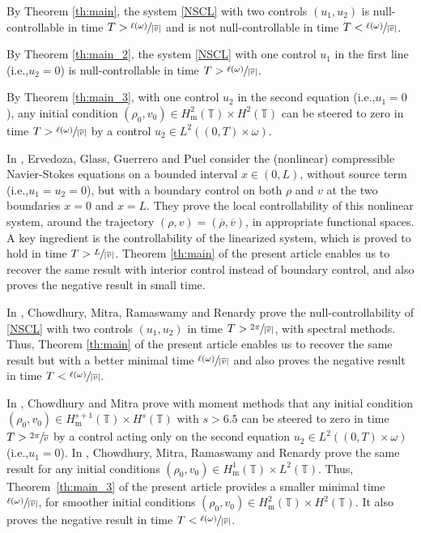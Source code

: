 \documentclass[11pt]{article}
\newcommand{\ie}{i.e.,\xspace}
\theoremstyle{plain}
\theoremstyle{definition}
\theoremstyle{remark}
\newcommand{\set}{\mathbb}
\newcommand{\T}{\set{T}}
\newcommand{\m}{{\mathrm m}}
\begin{document}
By Theorem \ref{th:main}, the system \eqref{NSCL} with two controls $(u_1,u_2)$ is null-controllable in time $T>\sfrac{\ell(\omega)}{|\overline{v}|}$ and is not null-controllable in time $T<\sfrac{\ell(\omega)}{|\overline{v}|}$.

By Theorem \ref{th:main_2}, the system \eqref{NSCL} with one control $u_1$ in the first line (\ie $u_2=0$) is null-controllable in time $T>\sfrac{\ell(\omega)}{|\overline{v}|}$.

By Theorem \ref{th:main_3}, with one control $u_2$ in the second equation (\ie $u_1=0$), any initial condition $(\rho_0,v_0)\in H^2_\m(\T)\times H^2(\T)$ can be steered to zero in time $T>\sfrac{\ell(\omega)}{|\overline{v}|}$ by a control $u_2 \in L^2((0,T)\times\omega)$.

In \cite{ervedoza_2012}, Ervedoza, Glass, Guerrero and Puel consider the (nonlinear) compressible Navier-Stokes equations on a bounded interval $x \in (0,L)$, without source term (\ie $u_1=u_2=0$), but with a boundary control on both $\rho$ and $v$ at the two boundaries $x=0$ and $x=L$. They prove the local controllability of this nonlinear system, around the trajectory $(\rho,v)=(\overline{\rho},\overline{v})$, in appropriate functional spaces. A key ingredient is the controllability of the linearized system, which is proved to hold in time $T>\sfrac{L}{|\overline{v}|}$. Theorem \ref{th:main} of the present article enables us to recover the same result with interior control instead of boundary control, and also proves the negative result in small time.

In \cite[Th.\,1.4]{chowdhury_2014}, Chowdhury, Mitra, Ramaswamy and Renardy prove the null-controllability of \eqref{NSCL} with two controls $(u_1,u_2)$ in time $T>\sfrac{2\pi}{|\overline{v}|}$, with spectral methods. Thus, Theorem \ref{th:main} of the present article enables us to recover the same result but with a better minimal time $\sfrac{\ell(\omega)}{|\overline{v}|}$ and also proves the negative result in time $T<\sfrac{\ell(\omega)}{|\overline{v}|}$.

In \cite[Th.\,1.3]{chowdhury_2015}, Chowdhury and Mitra prove with moment methods that any initial condition $(\rho_0,v_0)\in H^{s+1}_\m(\T)\times H^{s}(\mathbb{T})$ with $s> 6.5$ can be steered to zero in time $T>\sfrac{2\pi}{\overline{v}}$ by a control acting only on the second equation $u_2 \in L^2((0,T)\times\omega)$ (\ie $u_1=0$).
In \cite[Th.\,1.2]{chowdhury_2014}, Chowdhury, Mitra, Ramaswamy and Renardy prove the same result for any initial conditions $(\rho_0,v_0)\in H^1_\m(\T) \times L^2(\T)$. Thus, Theorem~\ref{th:main_3} of the present article provides a smaller minimal time $\sfrac{\ell(\omega)}{|\overline{v}|}$, for smoother initial conditions $(\rho_0,v_0)\in H^2_\m(\T)\times H^2(\T)$. It also proves the negative result in time $T<\nobreak\sfrac{\ell(\omega)}{|\overline{v}|}$.
\end{document}
